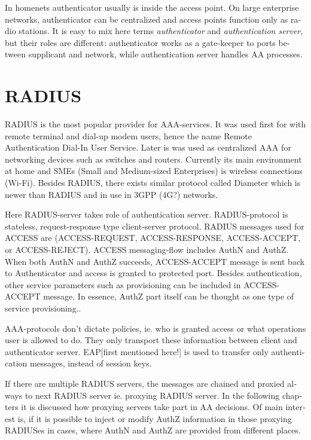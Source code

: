 \documentclass[12pt,a4paper,english]{tutthesis}
\begin{document}
\begin{otherlanguage}{english}
In homenets authenticator usually is inside the access point.
On large enterprise networks, authenticator can be centralized 
and access points function only as radio stations.
It is easy to mix here terms \emph{authenticator} and \emph{authentication
server}, but their roles are different: authenticator works as a
gate-keeper to ports between supplicant and network, while
authentication server handles AA processes.

\section{RADIUS}
\label{sec-2-2}
\label{section:radius}
RADIUS is the most popular provider for
AAA-services\cite[p.75]{radius-popular}.  It was used first for
with remote terminal and dial-up modem users, hence the name Remote
Authentication Dial-In User Service. Later is was used as centralized AAA
for networking devices such as switches and routers.  Currently its
main environment at home and SMEs (Small and Medium-sized Enterprises) is
wireless connections (Wi-Fi).  Besides RADIUS, there exists similar protocol
called Diameter which is newer than RADIUS and in use in 3GPP (4G?)
networks. 

Here RADIUS-server takes role of authentication server.
RADIUS-protocol is stateless, request-response type client-server
protocol.  RADIUS messages used for ACCESS are (ACCESS-REQUEST,
ACCESS-RESPONSE, ACCESS-ACCEPT, or ACCESS-REJECT). ACCESS
messaging-flow includes AuthN and AuthZ. When both AuthN and AuthZ
succeeds, ACCESS-ACCEPT message is sent back to Authenticator and
access is granted to protected port.  Besides authentication, other
service parameters such as provisioning can be included in
ACCESS-ACCEPT message. In essence, AuthZ part itself can be thought as
one type of service provisioning.\cite{rfc5608}.




AAA-protocols don't dictate policies, ie. who is granted access or
what operations user is allowed to do. They only transport these information
between client and authenticator server.
EAP[first mentioned here!] is used to transfer only authentication
messages, instead   of session keys. 

If there are multiple RADIUS servers, the messages are chained and
proxied always to next RADIUS server ie. proxying RADIUS server.
In the following chapters it is discussed how proxying servers take 
part in AA decisions. Of main interest is, if it is possible 
to inject or modify AuthZ information in those proxying RADIUSes in cases, 
where AuthN and AuthZ are provided from different
places\cite{rfc2607}.



\end{otherlanguage}
\end{document}
